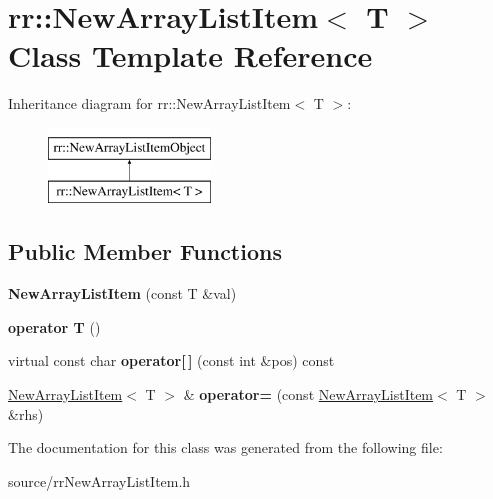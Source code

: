 \hypertarget{classrr_1_1_new_array_list_item}{\section{rr\-:\-:New\-Array\-List\-Item$<$ T $>$ Class Template Reference}
\label{classrr_1_1_new_array_list_item}
}
Inheritance diagram for rr\-:\-:New\-Array\-List\-Item$<$ T $>$\-:\begin{figure}[H]
\begin{center}
\leavevmode
\includegraphics[height=2.000000cm]{classrr_1_1_new_array_list_item}
\end{center}
\end{figure}
\subsection*{Public Member Functions}
\begin{DoxyCompactItemize}
\item 
\hypertarget{classrr_1_1_new_array_list_item_ad4f55b67a3c351b70809f9193dfb23d7}{{\bfseries New\-Array\-List\-Item} (const T \&val)}\label{classrr_1_1_new_array_list_item_ad4f55b67a3c351b70809f9193dfb23d7}

\item 
\hypertarget{classrr_1_1_new_array_list_item_a0397432ae11057171a6463479b19b093}{{\bfseries operator T} ()}\label{classrr_1_1_new_array_list_item_a0397432ae11057171a6463479b19b093}

\item 
\hypertarget{classrr_1_1_new_array_list_item_acc92aa4a9289bc82f0ec9b5dd7b8da9a}{virtual const char {\bfseries operator\mbox{[}$\,$\mbox{]}} (const int \&pos) const }\label{classrr_1_1_new_array_list_item_acc92aa4a9289bc82f0ec9b5dd7b8da9a}

\item 
\hypertarget{classrr_1_1_new_array_list_item_a9d1d1432b5e921575b4c135b4ebb257b}{\hyperlink{classrr_1_1_new_array_list_item}{New\-Array\-List\-Item}$<$ T $>$ \& {\bfseries operator=} (const \hyperlink{classrr_1_1_new_array_list_item}{New\-Array\-List\-Item}$<$ T $>$ \&rhs)}\label{classrr_1_1_new_array_list_item_a9d1d1432b5e921575b4c135b4ebb257b}

\end{DoxyCompactItemize}


The documentation for this class was generated from the following file\-:\begin{DoxyCompactItemize}
\item 
source/rr\-New\-Array\-List\-Item.\-h\end{DoxyCompactItemize}
